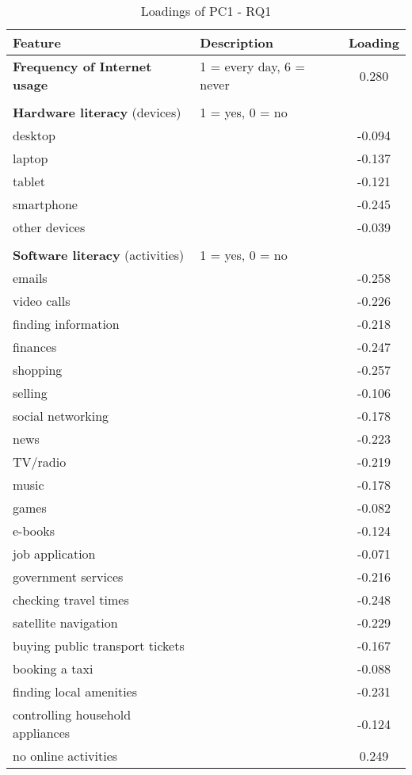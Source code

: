 \documentclass[12pt]{article}
\begin{document}
    \begin{table}[h!]
        \centering
        \caption{Loadings of PC1 - RQ1}
        \label{tab:pc1_loadings_rq1}
        \begin{tabular}{llc}
            \toprule
            Feature & Description & Loading \\
            \midrule
            \textbf{Frequency of Internet usage} & 1 = every day, 6 = never & 0.280 \\
            & & \\
            \textbf{Hardware literacy} (devices) & 1 = yes, 0 = no & \\
            desktop &  & -0.094 \\
            laptop &  & -0.137 \\
            tablet &  & -0.121 \\
            smartphone &  & -0.245 \\
            other devices &  & -0.039 \\
            & & \\
            \textbf{Software literacy} (activities) & 1 = yes, 0 = no & \\
            emails &  & -0.258 \\
            video calls &  & -0.226 \\
            finding information &  & -0.218 \\
            finances &  & -0.247 \\
            shopping &  & -0.257 \\
            selling &  & -0.106 \\
            social networking &  & -0.178 \\
            news &  & -0.223 \\
            TV/radio &  & -0.219 \\
            music &  & -0.178 \\
            games &  & -0.082 \\
            e-books &  & -0.124 \\
            job application &  & -0.071 \\
            government services &  & -0.216 \\
            checking travel times &  & -0.248 \\
            satellite navigation &  & -0.229 \\
            buying public transport tickets &  & -0.167 \\
            booking a taxi &  & -0.088 \\
            finding local amenities &  & -0.231 \\
            controlling household appliances &  & -0.124 \\
            no online activities &  & 0.249 \\
            \bottomrule
        \end{tabular}
    \end{table}
\end{document}
